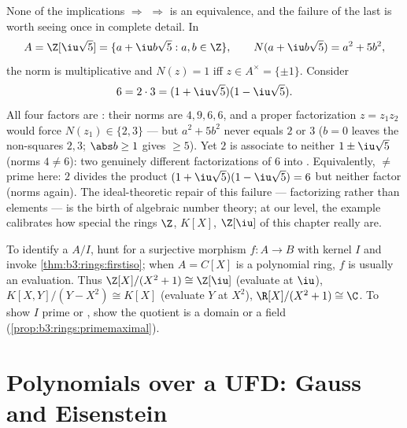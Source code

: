 \begin{example}
\label{ex:b3:rings:nonufd}
None of the implications  $\Rightarrow$ 
$\Rightarrow$  is an equivalence, and the failure of the
last is worth seeing once in complete detail. In
\[
A = \Z[\iu\sqrt5] = \{a + \iu b\sqrt5 : a, b \in \Z\},
\qquad N(a + \iu b\sqrt5) = a^2 + 5b^2,
\]
the norm is multiplicative and $N(z) = 1$ iff $z \in
A^\times = \{\pm1\}$. Consider
\[
6 = 2 \cdot 3 = (1 + \iu\sqrt5)(1 - \iu\sqrt5).
\]
All four factors are : their norms are $4, 9, 6,
6$, and a proper factorization $z = z_1z_2$ would force
$N(z_1) \in \{2, 3\}$ --- but $a^2 + 5b^2$ never equals $2$
or $3$ ($b = 0$ leaves the non-squares $2, 3$; $\abs b \geq
1$ gives $\geq 5$). Yet $2$ is associate to neither $1 \pm
\iu\sqrt5$ (norms $4 \neq 6$): two genuinely different
factorizations of $6$ into . Equivalently,
 $\neq$ prime here: $2$ divides the product $(1 +
\iu\sqrt5)(1 - \iu\sqrt5) = 6$ but neither factor (norms
again). The ideal-theoretic repair of this failure ---
factorizing \emph{} rather than elements --- is the
birth of algebraic number theory; at our level, the example
calibrates how special the  rings $\Z$, $K[X]$,
$\Z[\iu]$ of this chapter really are.
\end{example}

\begin{method}\label{met:b3:rings:quotient}
To identify a  $A/I$, hunt for a surjective morphism
$f \colon A \to B$ with kernel $I$ and invoke
\cref{thm:b3:rings:firstiso}; when $A = C[X]$ is a polynomial
ring, $f$ is usually an evaluation. Thus $\Z[X]/(X^2+1) \cong
\Z[\iu]$ (evaluate at $\iu$), $K[X,Y]/(Y - X^2) \cong K[X]$
(evaluate $Y$ at $X^2$), $\R[X]/(X^2+1) \cong \C$. To show $I$
prime or , show the quotient is a domain or a field
(\cref{prop:b3:rings:primemaximal}).
\end{method}

\section{Polynomials over a UFD: Gauss and Eisenstein}

